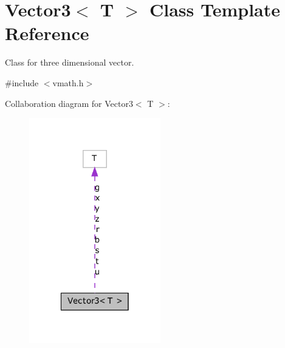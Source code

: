 \hypertarget{class_vector3}{
\section{Vector3$<$ T $>$ Class Template Reference}
\label{class_vector3}
}


Class for three dimensional vector.  




{\ttfamily \#include $<$vmath.h$>$}



Collaboration diagram for Vector3$<$ T $>$:\nopagebreak
\begin{figure}[H]
\begin{center}
\leavevmode
\includegraphics[width=162pt]{class_vector3__coll__graph}
\end{center}
\end{figure}
